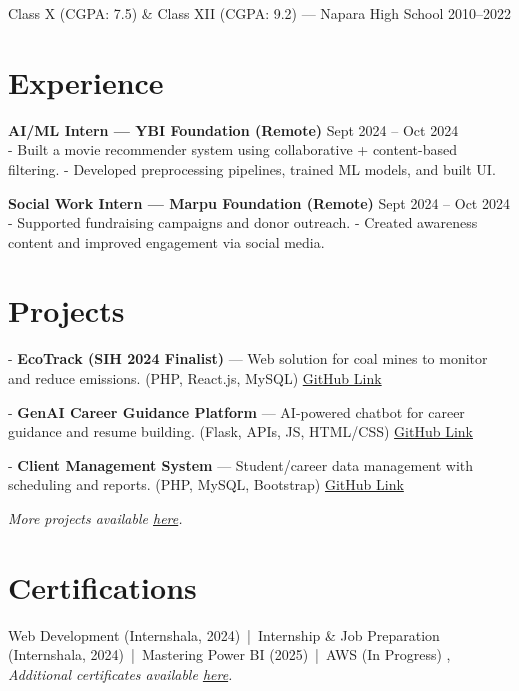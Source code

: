 Class X (CGPA: 7.5) \& Class XII (CGPA: 9.2) — Napara High School \hfill 2010–2022

\section*{Experience}
\textbf{AI/ML Intern — YBI Foundation (Remote)} \hfill Sept 2024 – Oct 2024 \\
- Built a movie recommender system using collaborative + content-based filtering.  
- Developed preprocessing pipelines, trained ML models, and built UI.  

\textbf{Social Work Intern — Marpu Foundation (Remote)} \hfill Sept 2024 – Oct 2024 \\
- Supported fundraising campaigns and donor outreach.  
- Created awareness content and improved engagement via social media.  

\section*{Projects}
- \textbf{EcoTrack (SIH 2024 Finalist)} — Web solution for coal mines to monitor and reduce emissions. (PHP, React.js, MySQL) \href{https://github.com/Buddhadeb-kgec/Eco_TrackMine}{GitHub Link}  

- \textbf{GenAI Career Guidance Platform} — AI-powered chatbot for career guidance and resume building. (Flask, APIs, JS, HTML/CSS) \href{https://github.com/Buddhadeb-kgec/genai-career-guidance-backend}{GitHub Link}  

- \textbf{Client Management System} — Student/career data management with scheduling and reports. (PHP, MySQL, Bootstrap) \href{https://github.com/Buddhadeb-kgec/client_Management_with_paymet.github.io}{GitHub Link}  

\vspace{4pt}
\textit{More projects available \href{https://github.com/Buddhadeb-kgec?tab=repositories}{here}.}


\section*{Certifications}
Web Development (Internshala, 2024) \,|\, Internship \& Job Preparation (Internshala, 2024) \,|\, Mastering Power BI (2025) \,|\, AWS (In Progress) , \vspace{4pt}
\textit{Additional certificates available \href{https://drive.google.com/file/d/1o1opHWAtAEBYSnjugGerVGA0wlP631wh/view?usp=drive_link}{here}.}

